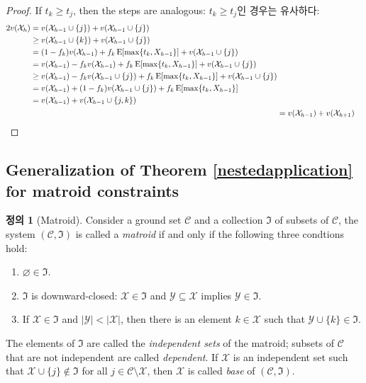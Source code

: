 \documentclass[11pt]{article} %
\theoremstyle{definition}
\newtheorem{definition}{Definition}
\theoremstyle{definition}
\newtheorem{definition}{정의}
\begin{document}
\begin{proof}
\ifen If $t_k \geq t_j$, then the steps are analogous:
\else  $t_k \geq t_j$인 경우는 유사하다:\fi
\begin{align}
\begin{split}
2 v(\mathcal{X}_h) &= v(\mathcal{X}_{h-1} \cup\{j\}) + v(\mathcal{X}_{h-1} \cup\{j\}) \\
&\geq v(\mathcal{X}_{h-1} \cup\{k\}) + v(\mathcal{X}_{h-1} \cup\{j\}) \\
&= (1 - f_k) v(\mathcal{X}_{h-1}) + f_k \operatorname{E}[\max\{t_k, X_{h-1}\}] +  v(\mathcal{X}_{h-1} \cup\{j\})  \\
&= v(\mathcal{X}_{h-1}) - f_k  v(\mathcal{X}_{h-1}) + f_k \operatorname{E}[\max\{t_k, X_{h-1}\}] +  v(\mathcal{X}_{h-1} \cup\{j\})  \\
&\geq v(\mathcal{X}_{h-1}) - f_k  v(\mathcal{X}_{h-1}\cup\{j\}) + f_k \operatorname{E}[\max\{t_k, X_{h-1}\}] +  v(\mathcal{X}_{h-1} \cup\{j\})  \\
&= v(\mathcal{X}_{h-1}) + (1 - f_k) v(\mathcal{X}_{h-1}\cup\{j\}) + f_k \operatorname{E}[\max\{t_k, X_{h-1}\}]  \\
&= v(\mathcal{X}_{h-1}) + v(\mathcal{X}_{h-1} \cup\{j, k\})
\end{split}\\
&= v(\mathcal{X}_{h-1})  + v(\mathcal{X}_{h+1}) \qedhere
\end{align}
\end{proof}



\iffalse

\subsection{Generalization of Theorem \ref{nestedapplication} for matroid constraints} \label{matroidnestedapplicationheader}

\begin{definition}[Matroid]
Consider a ground set $\mathcal{C}$ and a collection $\mathfrak{I}$ of subsets of $\mathcal{C}$, the system $(\mathcal{C}, \mathfrak{I})$ is called a \emph{matroid} if and only if the following three condtions hold:
\begin{enumerate}
\item $\varnothing \in \mathfrak{I}$.
\item $\mathfrak{I}$ is downward-closed: $\mathcal{X} \in \mathfrak{I}$ and $ \mathcal{Y} \subseteq \mathcal{X}$ implies $\mathcal{Y} \in \mathfrak{I}$.
\item If $\mathcal{X} \in \mathfrak{I}$ and $|\mathcal{Y}| < |\mathcal{X}|$, then there is an element $k \in \mathcal{X}$ such that $\mathcal{Y} \cup \{k\} \in \mathfrak{I}$. 
\end{enumerate}
The elements of $\mathfrak{I}$ are called the \emph{independent sets} of the matroid; subsets of $\mathcal{C}$ that are not independent are called \emph{dependent}. If $\mathcal{X}$ is an independent set such that $\mathcal{X} \cup \{j\} \notin \mathfrak{I}$ for all $j \in\mathcal{C} \setminus \mathcal{X}$, then $\mathcal{X}$ is called \emph{base} of $(\mathcal{C}, \mathfrak{I})$. %
\end{definition}
\end{document}
